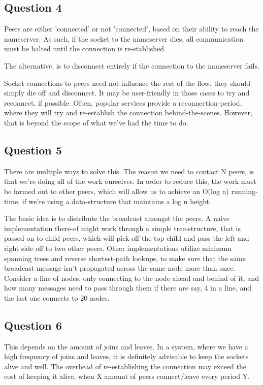 \subsection{Question 4}
Peers are either 'connected' or not 'connected', based on their
ability to reach the nameserver. As such, if the socket to the nameserver
dies, all communication must be halted until the connection is re-stablished.

The alternative, is to disconnect entirely if the connection to the nameserver fails.

Socket connections to peers need not influence the rest of the flow, they should simply die
off and disconnect. It may be user-friendly in those cases to try and reconnect, if possible.
Often, popular services provide a reconnection-period, where they will try and re-establish the
connection behind-the-scenes. However, that is beyond the scope of what we've had the time to do.


\subsection{Question 5}
There are multiple ways to solve this. The reason we need to contact N peers, is that we're doing all
of the work ourselves. In order to reduce this, the work must be farmed out to other peers, which will
allow us to achieve an O(log n) running-time, if we're using a data-structure that maintains a log n height.

The basic idea is to distribute the broadcast amongst the peers. A naive implementation there-of might work
through a simple tree-structure, that is passed on to child peers, which will pick off the top child and pass
the left and right side off to two other peers. Other implementations utilize minimum spanning trees and reverse
shortest-path lookups, to make sure that the same broadcast message isn't propagated across the same node more than
once. Consider a line of nodes, only connecting to the node ahead and behind of it, and how many messages need to pass
through them if there are say, 4 in a line, and the last one connects to 20 nodes.

\subsection{Question 6}
This depends on the amount of joins and leaves. In a system, where we have a high frequency of joins and leaves, it is
definitely advisable to keep the sockets alive and well. The overhead of re-establishing the connection may exceed the
cost of keeping it alive, when X amount of peers connect/leave every period Y.

